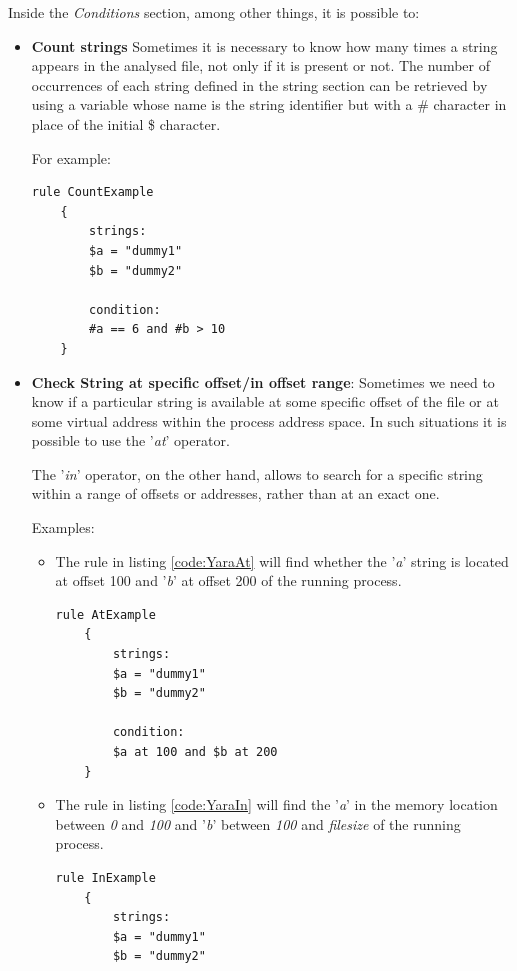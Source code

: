 \documentclass[pdfa%
,cucitura%
]{toptesi}
\begin{document}
Inside the \textit{Conditions} section, among other things, it is possible to:
\begin{itemize}
	\item \textbf{Count strings}
	Sometimes it is necessary to know how many times a string appears in the analysed file, not only if it is present or not. The number of occurrences of each string defined in the string section can be retrieved by using a variable whose name is the string identifier but with a \# character in place of the initial \$ character.
	
	For example:
	\begin{lstlisting}[caption={YARA Count Example}, label=code:YaraCount, language=YARA, style=mystyle]
	rule CountExample
	{
		strings:
		$a = "dummy1"
		$b = "dummy2"
		
		condition:
		#a == 6 and #b > 10
	}
	\end{lstlisting}
	
	\item \textbf{Check String at specific offset/in offset range}: Sometimes we need to know if a particular string is available at some specific offset of the file or at some virtual address within the process address space. In such situations it is possible to use the '\textit{at}' operator.
	
	The '\textit{in}' operator, on the other hand, allows to search for a specific string within a range of offsets or addresses, rather than at an exact one.
	
	Examples:
	\begin{itemize}
		\item The rule in listing \ref{code:YaraAt} will find whether the '\textit{a}' string is located at offset 100 and '\textit{b}' at offset 200 of the running process.
		
		\begin{lstlisting}[caption={YARA At Example}, label=code:YaraAt, language=YARA, style=mystyle]
	rule AtExample
	{
		strings:
		$a = "dummy1"
		$b = "dummy2"
		
		condition:
		$a at 100 and $b at 200
	}
		\end{lstlisting}
		
		\item The rule in listing \ref{code:YaraIn} will find the '\textit{a}' in the memory location between \textit{0} and \textit{100} and '\textit{b}' between \textit{100} and \textit{filesize} of the running process.
		
		\begin{lstlisting}[caption={YARA In Example}, label=code:YaraIn, language=YARA, style=mystyle]
	rule InExample
	{
		strings:
		$a = "dummy1"
		$b = "dummy2"
		

\end{lstlisting}
\end{itemize}
\end{itemize}
\end{document}
